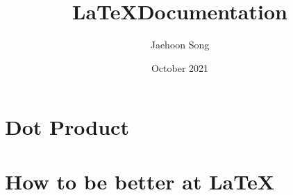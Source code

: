 \documentclass[12pt]{report}
\title{\LaTeX \space Documentation}
\author{Jaehoon Song}
\date{October 2021}
\begin{document}
 









\maketitle
\tableofcontents
\chapter{Dot Product}

\appendix
\chapter{How to be better at \LaTeX}

\printbibliography  %
\end{document}
